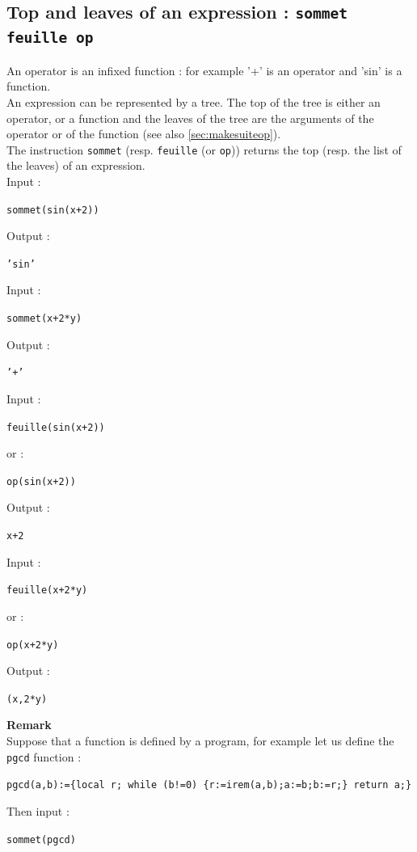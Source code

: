\documentclass[a4paper,11pt]{book}
\begin{document}
\subsection{Top and leaves of an expression : {\tt sommet feuille op}}\label{sec:op}
An operator is an  infixed function : for example '+' is an 
operator and 'sin' is a function.\\
An expression can be represented by a tree. The top of the tree is 
either an operator, or a function and the leaves of the tree are the 
arguments of the operator or of the function 
(see also \ref{sec:makesuiteop}).\\
The instruction {\tt sommet} (resp. {\tt feuille} (or {\tt op}))
returns the top (resp. the list of the leaves) of an expression.\\
Input :
\begin{center}{\tt sommet(sin(x+2))}\end{center}
Output :
\begin{center}{\tt 'sin'}\end{center}  
Input :
\begin{center}{\tt sommet(x+2*y)}\end{center}
Output :
\begin{center}{\tt '+'}\end{center}  
Input :
\begin{center}{\tt feuille(sin(x+2))}\end{center}
or :
\begin{center}{\tt op(sin(x+2))}\end{center}
Output :
\begin{center}{\tt x+2}\end{center}  
Input :
\begin{center}{\tt feuille(x+2*y)}\end{center}
or :
\begin{center}{\tt op(x+2*y)}\end{center}
Output :
\begin{center}{\tt (x,2*y) }\end{center} 
{\bf Remark}\\
Suppose that a function is defined by a program, for example 
let us define the {\tt pgcd} function :
\begin{center}{\tt pgcd(a,b):=\{local r; while (b!=0) \{r:=irem(a,b);a:=b;b:=r;\} return a;\}}\end{center}
Then input :
\begin{center}{\tt sommet(pgcd)}\end{center}
\end{document}
